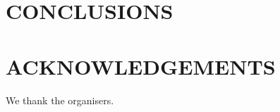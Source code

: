 \section{CONCLUSIONS}
\label{sec:hjetscomp:conclusions}




\section*{ACKNOWLEDGEMENTS}

We thank the organisers.